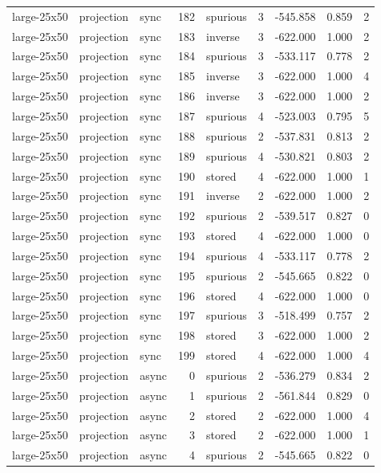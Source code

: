 \begin{tabular}{lllrlrrrr}
large-25x50 & projection & sync & 182 & spurious & 3 & -545.858 & 0.859 & 2 \\
large-25x50 & projection & sync & 183 & inverse & 3 & -622.000 & 1.000 & 2 \\
large-25x50 & projection & sync & 184 & spurious & 3 & -533.117 & 0.778 & 2 \\
large-25x50 & projection & sync & 185 & inverse & 3 & -622.000 & 1.000 & 4 \\
large-25x50 & projection & sync & 186 & inverse & 3 & -622.000 & 1.000 & 2 \\
large-25x50 & projection & sync & 187 & spurious & 4 & -523.003 & 0.795 & 5 \\
large-25x50 & projection & sync & 188 & spurious & 2 & -537.831 & 0.813 & 2 \\
large-25x50 & projection & sync & 189 & spurious & 4 & -530.821 & 0.803 & 2 \\
large-25x50 & projection & sync & 190 & stored & 4 & -622.000 & 1.000 & 1 \\
large-25x50 & projection & sync & 191 & inverse & 2 & -622.000 & 1.000 & 2 \\
large-25x50 & projection & sync & 192 & spurious & 2 & -539.517 & 0.827 & 0 \\
large-25x50 & projection & sync & 193 & stored & 4 & -622.000 & 1.000 & 0 \\
large-25x50 & projection & sync & 194 & spurious & 4 & -533.117 & 0.778 & 2 \\
large-25x50 & projection & sync & 195 & spurious & 2 & -545.665 & 0.822 & 0 \\
large-25x50 & projection & sync & 196 & stored & 4 & -622.000 & 1.000 & 0 \\
large-25x50 & projection & sync & 197 & spurious & 3 & -518.499 & 0.757 & 2 \\
large-25x50 & projection & sync & 198 & stored & 3 & -622.000 & 1.000 & 2 \\
large-25x50 & projection & sync & 199 & stored & 4 & -622.000 & 1.000 & 4 \\
large-25x50 & projection & async & 0 & spurious & 2 & -536.279 & 0.834 & 2 \\
large-25x50 & projection & async & 1 & spurious & 2 & -561.844 & 0.829 & 0 \\
large-25x50 & projection & async & 2 & stored & 2 & -622.000 & 1.000 & 4 \\
large-25x50 & projection & async & 3 & stored & 2 & -622.000 & 1.000 & 1 \\
large-25x50 & projection & async & 4 & spurious & 2 & -545.665 & 0.822 & 0 \\

\end{tabular}
